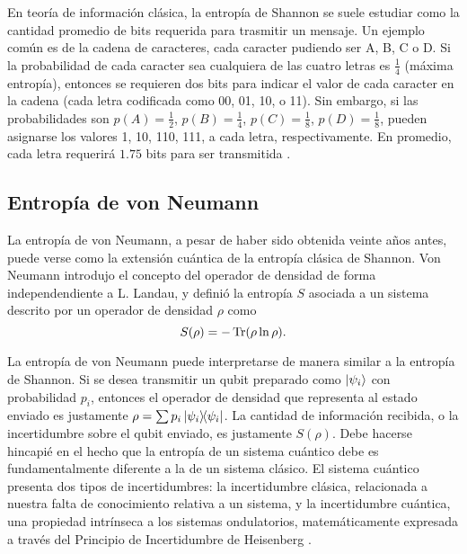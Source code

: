 En teoría de información clásica, la entropía de Shannon se suele estudiar como la cantidad promedio de bits requerida para trasmitir un mensaje. Un ejemplo común es de la cadena de caracteres, cada caracter pudiendo ser A, B, C o D. Si la probabilidad de cada caracter sea cualquiera de las cuatro letras es $\frac{1}{4}$ (máxima entropía), entonces se requieren dos bits para indicar el valor de cada caracter en la cadena (cada letra codificada como 00, 01, 10, o 11). Sin embargo, si las probabilidades son $p(A)=\frac{1}{2}$, $p(B)=\frac{1}{4}$, $p(C)=\frac{1}{8}$, $p(D)=\frac{1}{8}$, pueden asignarse los valores 1, 10, 110, 111, a cada letra, respectivamente. En promedio, cada letra requerirá $1.75$ bits para ser transmitida \cite{Chuang}. 

\subsection{Entropía de von Neumann}

La entropía de von Neumann, a pesar de haber sido obtenida veinte años antes, puede verse como la extensión cuántica de la entropía clásica de Shannon. Von Neumann introdujo el concepto del operador de densidad de forma independendiente a L. Landau, y definió la entropía $S$ asociada a un sistema descrito por un operador de densidad $\rho$ como \cite{vonNeumann}
\begin{equation}\label{eq:VonNeumannEntropy}
    S(\rho)=-\Tr(\rho\ln{\rho}).
\end{equation}

La entropía de von Neumann puede interpretarse de manera similar a la entropía de Shannon. Si se desea transmitir un qubit preparado como $\ket{\psi_{i}}$ con probabilidad $p_{i}$, entonces el operador de densidad que representa al estado enviado es justamente $\rho=\sum p_{i}\dyad{\psi_{i}}$. La cantidad de información recibida, o la incertidumbre sobre el qubit enviado, es justamente $S(\rho)$. Debe hacerse hincapié en el hecho que la entropía de un sistema cuántico debe es fundamentalmente diferente a la de un sistema clásico. El sistema cuántico presenta dos tipos de incertidumbres: la incertidumbre clásica, relacionada a nuestra falta de conocimiento relativa a un sistema, y la incertidumbre cuántica, una propiedad intrínseca a los sistemas ondulatorios, matemáticamente expresada a través del Principio de Incertidumbre de Heisenberg \cite{Wilde}.


